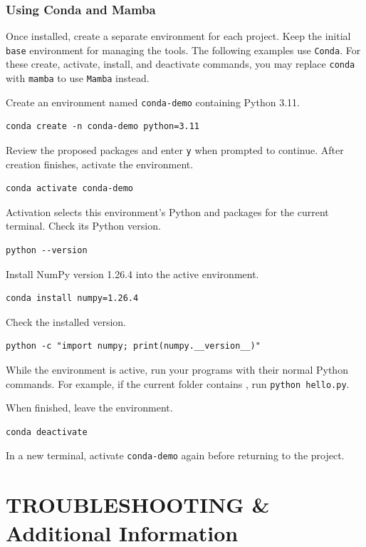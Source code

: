 \documentclass[12pt]{article}
\newcommand{\program}[1]{\begingroup\setlength{\fboxsep}{2pt}%
  \colorbox{ProgramBackground}{\texttt{#1}}\endgroup}
\newcommand{\inlinecode}[1]{\begingroup\setlength{\fboxsep}{2pt}%
  \colorbox{black!5}{\texttt{#1}}\endgroup}
\begin{document}
\subsubsection*{Using Conda and Mamba}

Once installed, create a separate environment for each project. Keep the initial \inlinecode{base} environment for managing the tools. The following examples use \program{Conda}. For these create, activate, install, and deactivate commands, you may replace \inlinecode{conda} with \inlinecode{mamba} to use \program{Mamba} instead.

Create an environment named \inlinecode{conda-demo} containing Python 3.11.
\begin{lstlisting}
conda create -n conda-demo python=3.11
\end{lstlisting}

Review the proposed packages and enter \inlinecode{y} when prompted to continue. After creation finishes, activate the environment.
\begin{lstlisting}
conda activate conda-demo
\end{lstlisting}

Activation selects this environment's Python and packages for the current terminal. Check its Python version.
\begin{lstlisting}
python --version
\end{lstlisting}

Install NumPy version 1.26.4 into the active environment.
\begin{lstlisting}
conda install numpy=1.26.4
\end{lstlisting}

Check the installed version.
\begin{lstlisting}
python -c "import numpy; print(numpy.__version__)"
\end{lstlisting}

While the environment is active, run your programs with their normal Python commands. For example, if the current folder contains , run \inlinecode{python hello.py}.

When finished, leave the environment.
\begin{lstlisting}
conda deactivate
\end{lstlisting}

In a new terminal, activate \inlinecode{conda-demo} again before returning to the project.


\clearpage
\section*{TROUBLESHOOTING \& Additional Information}
\end{document}

